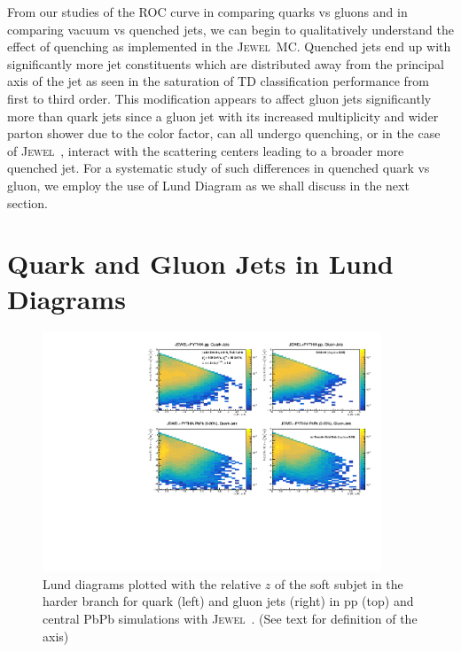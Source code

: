 \documentclass[notoc]{JHEP3}
\newcommand{\jw}{\textsc{Jewel}~}
\begin{document}
From our studies of the ROC curve in comparing quarks vs gluons and in comparing vacuum vs quenched jets, we can begin to qualitatively understand the effect of quenching as implemented in the \jw MC. Quenched jets end up with significantly more jet constituents which are distributed away from the principal axis of the jet as seen in the saturation of TD classification performance from first to third order. This modification appears to affect gluon jets significantly more than quark jets since a gluon jet with its increased multiplicity and wider parton shower due to the color factor, can all undergo quenching, or in the case of \jw, interact with the scattering centers leading to a broader more quenched jet. For a systematic study of such differences in quenched quark vs gluon, we employ the use of Lund Diagram as we shall discuss in the next section.

\section{Quark and Gluon Jets in Lund Diagrams}
\label{sec:lund}

\begin{figure}[t]
	\centering
	\includegraphics[width=0.9\textwidth]{plots/Individual_LundDiagrams_zrel.pdf}
	\caption{Lund diagrams plotted with the relative $z$ of the soft subjet in the harder branch for quark (left) and gluon jets (right) in pp (top) and central PbPb simulations with \jw. (See text for definition of the axis)}
\label{fig:Lund_full}
\end{figure}
\end{document}
